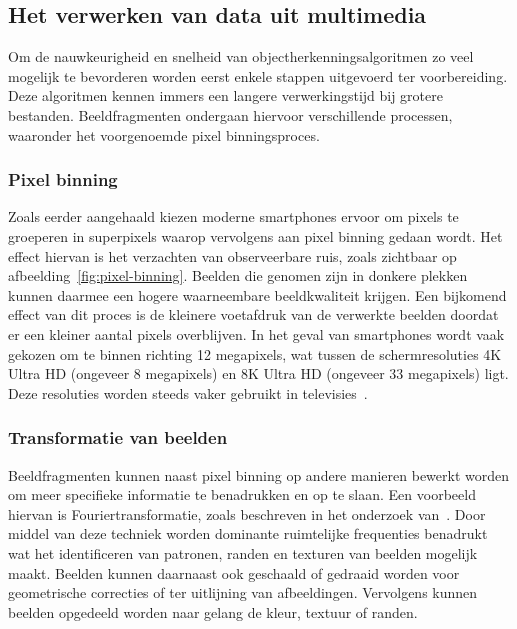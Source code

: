 \subsection{Het verwerken van data uit multimedia}\label{subsec:het-verwerken-van-data}
Om de nauwkeurigheid en snelheid van objectherkenningsalgoritmen zo veel mogelijk te bevorderen worden eerst enkele stappen uitgevoerd ter voorbereiding.
Deze algoritmen kennen immers een langere verwerkingstijd bij grotere bestanden.
Beeldfragmenten ondergaan hiervoor verschillende processen, waaronder het voorgenoemde pixel binningsproces.

\subsubsection{Pixel binning}
Zoals eerder aangehaald kiezen moderne smartphones ervoor om pixels te groeperen in superpixels waarop vervolgens aan pixel binning gedaan wordt.
Het effect hiervan is het verzachten van observeerbare ruis, zoals zichtbaar op afbeelding~\ref{fig:pixel-binning}.
Beelden die genomen zijn in donkere plekken kunnen daarmee een hogere waarneembare beeldkwaliteit krijgen.
Een bijkomend effect van dit proces is de kleinere voetafdruk van de verwerkte beelden doordat er een kleiner aantal pixels overblijven.
In het geval van smartphones wordt vaak gekozen om te binnen richting 12 megapixels, wat tussen de schermresoluties 4K Ultra HD (ongeveer 8 megapixels) en 8K Ultra HD (ongeveer 33 megapixels) ligt.
Deze resoluties worden steeds vaker gebruikt in televisies~\autocite{Statista2024}.

\subsubsection{Transformatie van beelden}
Beeldfragmenten kunnen naast pixel binning op andere manieren bewerkt worden om meer specifieke informatie te benadrukken en op te slaan.
Een voorbeeld hiervan is Fouriertransformatie, zoals beschreven in het onderzoek van~\textcite{Olaoye2024}.
Door middel van deze techniek worden dominante ruimtelijke frequenties benadrukt wat het identificeren van patronen, randen en texturen van beelden mogelijk maakt.
Beelden kunnen daarnaast ook geschaald of gedraaid worden voor geometrische correcties of ter uitlijning van afbeeldingen.
Vervolgens kunnen beelden opgedeeld worden naar gelang de kleur, textuur of randen.


